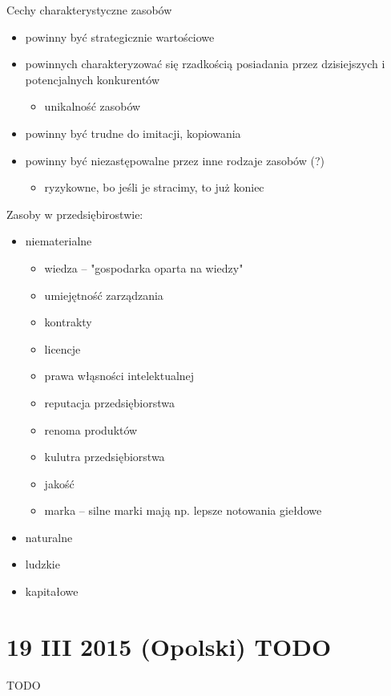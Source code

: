 \documentclass[a4paper,10pt]{report}
\begin{document}
\noindent Cechy charakterystyczne zasobów
\begin{itemize}
	\item powinny być strategicznie wartościowe
	\item powinnych charakteryzować się rzadkością posiadania przez dzisiejszych i potencjalnych konkurentów
	\begin{itemize}
		\item unikalność zasobów
	\end{itemize}
	\item powinny być trudne do imitacji, kopiowania
	\item powinny być niezastępowalne przez inne rodzaje zasobów (?)
	\begin{itemize}
		\item ryzykowne, bo jeśli je stracimy, to już koniec
	\end{itemize}
\end{itemize}


\noindent Zasoby w przedsiębirostwie:
\begin{itemize}
	\item niematerialne
	\begin{itemize}
		\item wiedza -- "gospodarka oparta na wiedzy"
		\item umiejętność zarządzania
		\item kontrakty
		\item licencje
		\item prawa włąsności intelektualnej
		\item reputacja przedsiębiorstwa
		\item renoma produktów
		\item kulutra przedsiębiorstwa
		\item jakość
		\item marka -- silne marki mają np. lepsze notowania giełdowe
	\end{itemize}

	\item naturalne
	\item ludzkie
	\item kapitałowe
	
\end{itemize}


\section{19 III 2015 (Opolski) TODO}

TODO
\end{document}
